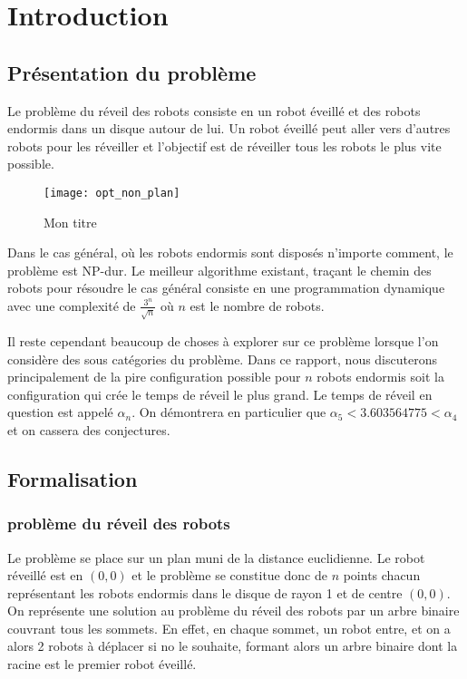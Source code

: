 \section{Introduction}

\subsection{Présentation du problème}

Le problème du réveil des robots consiste en un robot éveillé et des robots endormis dans un disque autour de lui. Un robot éveillé peut aller vers d'autres robots pour les réveiller et l'objectif est de réveiller tous les robots le plus vite possible.

\begin{figure}[h!]
  \centering
  \texttt{[image: opt\_non\_plan]}
  \caption{Mon titre}
  \label{fig:opt_non_plan}
\end{figure}

Dans le cas général, où les robots endormis sont disposés n'importe comment, le problème est NP-dur. Le meilleur algorithme existant, traçant le chemin des robots pour résoudre le cas général consiste en une programmation dynamique avec une complexité de $\frac{3^n}{\sqrt{n}}$ où $n$ est le nombre de robots.

Il reste cependant beaucoup de choses à explorer sur ce problème lorsque l'on considère des sous catégories du problème. Dans ce rapport, nous discuterons principalement de la pire configuration possible pour $n$ robots endormis soit la configuration qui crée le temps de réveil le plus grand. Le temps de réveil en question est appelé $\alpha_n$. On démontrera en particulier que $\alpha_5 < 3.603564775 < \alpha_4$ et on cassera des conjectures.
\subsection{Formalisation}

\subsubsection{problème du réveil des robots}

Le problème se place sur un plan muni de la distance euclidienne. Le robot réveillé est en $(0,0)$ et le problème se constitue donc de $n$ points chacun représentant les robots endormis dans le disque de rayon 1 et de centre $(0,0)$. On représente une solution au problème du réveil des robots par un arbre binaire couvrant tous les sommets. En effet, en chaque sommet, un robot entre, et on a alors 2 robots à déplacer si no le souhaite, formant alors un arbre binaire dont la racine est le premier robot éveillé.

